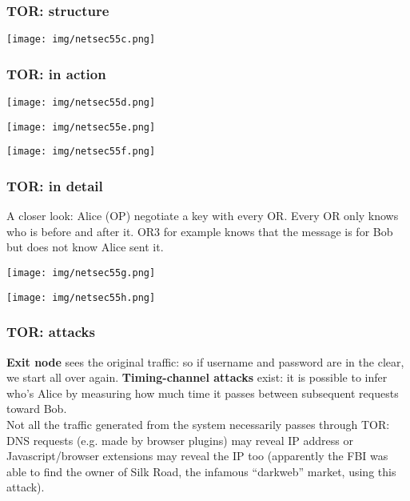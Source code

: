 \documentclass[a4paper, 10pt, titlepage]{article}
\begin{document}
\subsubsection*{TOR: structure}
\begin{center}
	\texttt{[image: img/netsec55c.png]}
\end{center}

\subsubsection*{TOR: in action}
\begin{minipage}{0.48\textwidth}
	\begin{center}
		\texttt{[image: img/netsec55d.png]}
	\end{center}
\end{minipage}\hfill
\begin{minipage}{0.48\textwidth}
	\begin{center}
		\texttt{[image: img/netsec55e.png]}
	\end{center}
\end{minipage}
\begin{center}
	\texttt{[image: img/netsec55f.png]}
\end{center}

\subsubsection*{TOR: in detail}
A closer look: Alice (OP) negotiate a key with every OR. Every OR only knows who is before and after it. OR3 for example knows that the message is for Bob but does not know Alice sent it.
\begin{center}
	\texttt{[image: img/netsec55g.png]}
\end{center}
\begin{center}
	\texttt{[image: img/netsec55h.png]}
\end{center}

\subsubsection*{TOR: attacks}
\textbf{Exit node} sees the original traffic: so if username and password are in the clear, we start all over again. \textbf{Timing-channel attacks} exist: it is possible to infer who’s Alice by measuring how much time it passes between subsequent requests toward Bob.\\ Not all the traffic generated from the system necessarily passes through TOR: DNS requests (e.g. made by browser plugins) may reveal IP address or Javascript/browser extensions may reveal the IP too (apparently the FBI was able to find the owner of Silk Road, the infamous “darkweb” market, using this attack).
\end{document}
